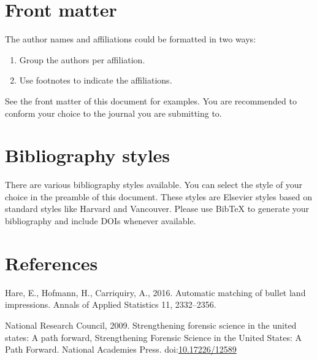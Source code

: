 \documentclass[]{elsarticle} %
\begin{document}
\hypertarget{front-matter}{%
\section{Front matter}\label{front-matter}}

The author names and affiliations could be formatted in two ways:

\begin{enumerate}
\def\labelenumi{(\arabic{enumi})}
\item
  Group the authors per affiliation.
\item
  Use footnotes to indicate the affiliations.
\end{enumerate}

See the front matter of this document for examples. You are recommended
to conform your choice to the journal you are submitting to.

\hypertarget{bibliography-styles}{%
\section{Bibliography styles}\label{bibliography-styles}}

There are various bibliography styles available. You can select the
style of your choice in the preamble of this document. These styles are
Elsevier styles based on standard styles like Harvard and Vancouver.
Please use BibTeX to generate your bibliography and include DOIs
whenever available.

\hypertarget{references}{%
\section*{References}\label{references}}

\hypertarget{refs}{}
\leavevmode\hypertarget{ref-Hare2016}{}%
Hare, E., Hofmann, H., Carriquiry, A., 2016. Automatic matching of
bullet land impressions. Annals of Applied Statistics 11, 2332--2356.

\leavevmode\hypertarget{ref-Council2009}{}%
National Research Council, 2009. Strengthening forensic science in the
united states: A path forward, Strengthening Forensic Science in the
United States: A Path Forward. National Academies Press.
doi:\href{https://doi.org/10.17226/12589}{10.17226/12589}
\end{document}
